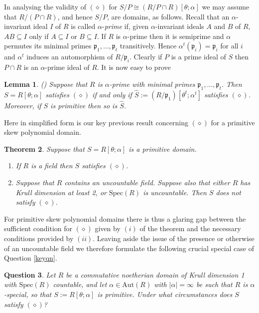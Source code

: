 \documentclass[a4paper, 11pt]{article}
\newtheorem{theorem}{Theorem}[section]
\newtheorem{lemma}[theorem]{Lemma}
\newtheorem{question}[theorem]{Question}
\theoremstyle{definition}
\begin{document}
In analysing the validity of $(\diamond)$ for $S/P \cong (R/P \cap R)[\theta ; \alpha]$ we may  assume that $R/(P \cap R)$, and hence $S/P$, are domains, as follows. Recall that an $\alpha$-invariant ideal $I$ of $R$ is called $\alpha$-{\it prime} if, given $\alpha$-invariant ideals $A$ and $B$ of $R$, $AB \subseteq I$ only if $A \subseteq I$ or $B \subseteq I$. If $R$ is $\alpha$-prime then it is semiprime and $\alpha$ permutes its minimal primes $\mathfrak{p}_1, \ldots , \mathfrak{p}_t$ transitively. Hence  $\alpha^t (\mathfrak{p}_i) = \mathfrak{p}_i$ for all $i$ and $\alpha^t$ induces an automorphism of $R/\mathfrak{p}_i$. Clearly if $P$ is a prime ideal of $S$ then $P \cap R $ is an $\alpha$-prime ideal of $R$. It is now easy to prove
\begin{lemma}\label{domain}(\cite[Lemma 4.5]{BCM}) Suppose that $R$ is $\alpha$-prime with minimal primes $\mathfrak{p}_1, \ldots , \mathfrak{p}_t$. Then $S = R[\theta; \alpha]$ satisfies $(\diamond)$ if and only if $\widehat{S} := (R/\mathfrak{p}_1)[\theta^t ; \alpha^t]$ satisfies $(\diamond)$. Moreover, if $S$ is primitive then so is $\widehat{S}$.
\end{lemma} 

\medskip

Here in simplified form is our key previous result concerning $(\diamond)$ for a primitive skew polynomial domain.

\begin{theorem}\label{primitive}\cite[Theorem 5.4]{BCM} Suppose that $S = R[\theta; \alpha]$ is a primitive domain.
\begin{enumerate}
\item[(i)] If $R$ is a field then $S$ satisfies $(\diamond)$.
\item[(ii)] Suppose that $R$ contains an uncountable field. Suppose also that either $R$ has Krull
dimension at least 2, or $\mathrm{Spec}(R)$ is uncountable. Then $S$ does not satisfy $(\diamond)$.
\end{enumerate}
\end{theorem}

\noindent For primitive skew polynomial domains there is thus a glaring gap between the sufficient condition for $(\diamond)$ given by $(i)$ of the theorem and the necessary conditions provided by $(ii)$. Leaving aside the issue of the presence or otherwise of an uncountable field we therefore formulate the following crucial special case of Question \ref{keyqn}.

\begin{question}\label{primitiveqn} Let $R$ be a commutative noetherian domain of Krull dimension 1 with $\mathrm{Spec}(R)$ countable, and let $\alpha \in \mathrm{Aut}(R)$ with $|\alpha| = \infty$ be such that $R$ is $\alpha$-special, so that $S := R[\theta ; \alpha]$ is primitive. Under what circumstances does $S$ satisfy $(\diamond)$?
\end{question}
\end{document}
